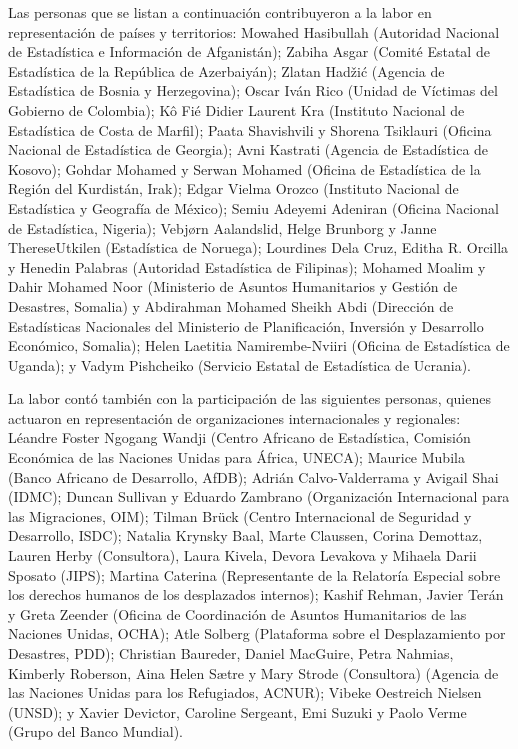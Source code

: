 \documentclass[
]{book}
\begin{document}
Las personas que se listan a continuación contribuyeron a la labor en representación de países y territorios: Mowahed Hasibullah (Autoridad Nacional de Estadística e Información de Afganistán); Zabiha Asgar (Comité Estatal de Estadística de la República de Azerbaiyán); Zlatan Hadžić (Agencia de Estadística de Bosnia y Herzegovina); Oscar Iván Rico (Unidad de Víctimas del Gobierno de Colombia); Kô Fié Didier Laurent Kra (Instituto Nacional de Estadística de Costa de Marfil); Paata Shavishvili y Shorena Tsiklauri (Oficina Nacional de Estadística de Georgia); Avni Kastrati (Agencia de Estadística de Kosovo); Gohdar Mohamed y Serwan Mohamed (Oficina de Estadística de la Región del Kurdistán, Irak); Edgar Vielma Orozco (Instituto Nacional de Estadística y Geografía de México); Semiu Adeyemi Adeniran (Oficina Nacional de Estadística, Nigeria); Vebjørn Aalandslid, Helge Brunborg y Janne ThereseUtkilen (Estadística de Noruega); Lourdines Dela Cruz, Editha R. Orcilla y Henedin Palabras (Autoridad Estadística de Filipinas); Mohamed Moalim y Dahir Mohamed Noor (Ministerio de Asuntos Humanitarios y Gestión de Desastres, Somalia) y Abdirahman Mohamed Sheikh Abdi (Dirección de Estadísticas Nacionales del Ministerio de Planificación, Inversión y Desarrollo Económico, Somalia); Helen Laetitia Namirembe-Nviiri (Oficina de Estadística de Uganda); y Vadym Pishcheiko (Servicio Estatal de Estadística de Ucrania).

La labor contó también con la participación de las siguientes personas, quienes actuaron en representación de organizaciones internacionales y regionales: Léandre Foster Ngogang Wandji (Centro Africano de Estadística, Comisión Económica de las Naciones Unidas para África, UNECA); Maurice Mubila (Banco Africano de Desarrollo, AfDB); Adrián Calvo-Valderrama y Avigail Shai (IDMC); Duncan Sullivan y Eduardo Zambrano (Organización Internacional para las Migraciones, OIM); Tilman Brück (Centro Internacional de Seguridad y Desarrollo, ISDC); Natalia Krynsky Baal, Marte Claussen, Corina Demottaz, Lauren Herby (Consultora), Laura Kivela, Devora Levakova y Mihaela Darii Sposato (JIPS); Martina Caterina (Representante de la Relatoría Especial sobre los derechos humanos de los desplazados internos); Kashif Rehman, Javier Terán y Greta Zeender (Oficina de Coordinación de Asuntos Humanitarios de las Naciones Unidas, OCHA); Atle Solberg (Plataforma sobre el Desplazamiento por Desastres, PDD); Christian Baureder, Daniel MacGuire, Petra Nahmias, Kimberly Roberson, Aina Helen Sætre y Mary Strode (Consultora) (Agencia de las Naciones Unidas para los Refugiados, ACNUR); Vibeke Oestreich Nielsen (UNSD); y Xavier Devictor, Caroline Sergeant, Emi Suzuki y Paolo Verme (Grupo del Banco Mundial).
\end{document}
